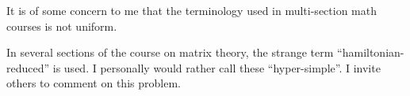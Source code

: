 \documentclass{sample}
\begin{document}
	It is of some concern to me that the terminology used in multi-section math courses is not uniform.
	
	In several sections of the course on matrix theory, the strange term ``hamil\-tonian-reduced'' is used. 
	I personally would rather call these ``hyper-simple''. I invite others to comment on this problem.
\end{document}
